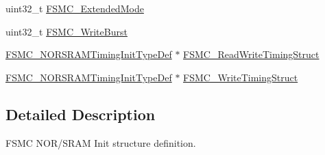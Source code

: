 \begin{DoxyCompactItemize}
\item 
uint32\_\-t \hyperlink{structFSMC__NORSRAMInitTypeDef_af33d0076b5bfea3a66e388ed7f3eb3f3}{FSMC\_\-ExtendedMode}
\item 
uint32\_\-t \hyperlink{structFSMC__NORSRAMInitTypeDef_adac3756711f2d76e56a8cbcb7a03843d}{FSMC\_\-WriteBurst}
\item 
\hyperlink{structFSMC__NORSRAMTimingInitTypeDef}{FSMC\_\-NORSRAMTimingInitTypeDef} $\ast$ \hyperlink{structFSMC__NORSRAMInitTypeDef_a33f8e281b9ff3187906309d005b4159e}{FSMC\_\-ReadWriteTimingStruct}
\item 
\hyperlink{structFSMC__NORSRAMTimingInitTypeDef}{FSMC\_\-NORSRAMTimingInitTypeDef} $\ast$ \hyperlink{structFSMC__NORSRAMInitTypeDef_ac62cf7426a933ce6aa6efc3a8e82dac1}{FSMC\_\-WriteTimingStruct}
\end{DoxyCompactItemize}


\subsection{Detailed Description}
FSMC NOR/SRAM Init structure definition. 

